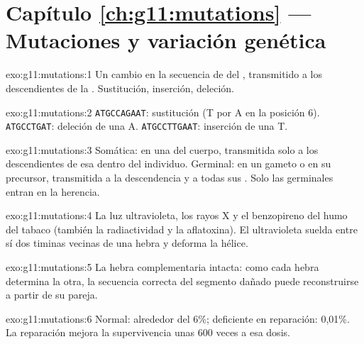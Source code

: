 \section*{Capítulo \ref{ch:g11:mutations} --- Mutaciones y variación genética}

\begin{solution}{exo:g11:mutations:1}
Un cambio en la secuencia de  del , transmitido a los
descendientes de la . Sustitución, inserción, deleción.
\end{solution}

\begin{solution}{exo:g11:mutations:2}
\texttt{ATGCCAGAAT}: sustitución (T por A en la posición 6).
\texttt{ATGCCTGAT}: deleción de una A. \texttt{ATGCCTTGAAT}: inserción
de una T.
\end{solution}

\begin{solution}{exo:g11:mutations:3}
Somática: en una  del cuerpo, transmitida solo a los
descendientes de esa  dentro del individuo. Germinal: en un
gameto o en su precursor, transmitida a la descendencia y a todas sus
. Solo las  germinales entran en la herencia.
\end{solution}

\begin{solution}{exo:g11:mutations:4}
La luz ultravioleta, los rayos X y el benzopireno del humo del tabaco
(también la radiactividad y la aflatoxina). El ultravioleta suelda
entre sí dos timinas vecinas de una hebra y deforma la hélice.
\end{solution}

\begin{solution}{exo:g11:mutations:5}
La hebra complementaria intacta: como cada hebra determina la otra, la
secuencia correcta del segmento dañado puede reconstruirse a partir de
su pareja.
\end{solution}

\begin{solution}{exo:g11:mutations:6}
Normal: alrededor del 6\%; deficiente en reparación: 0,01\%. La
reparación mejora la supervivencia unas 600 veces a esa dosis.
\end{solution}


